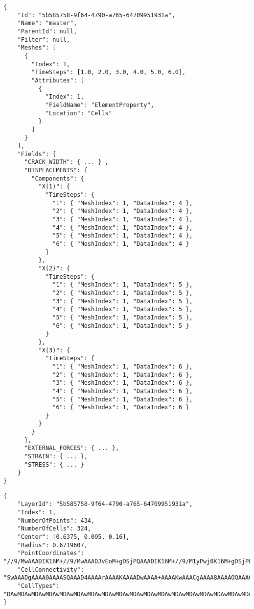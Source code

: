 \begin{lstlisting}[style=json,caption=Example of summary.json document,label=lst:summary.json]
{
    "Id": "5b585758-9f64-4790-a765-64709951931a",
    "Name": "master",
    "ParentId": null,
    "Filter": null,
    "Meshes": [
      {
        "Index": 1,
        "TimeSteps": [1.0, 2.0, 3.0, 4.0, 5.0, 6.0],
        "Attributes": [
          {
            "Index": 1,
            "FieldName": "ElementProperty",
            "Location": "Cells"
          }
        ]
      }
    ],
    "Fields": {
      "CRACK_WIDTH": { ... } ,
      "DISPLACEMENTS": {
        "Components": {
          "X(1)": {
            "TimeSteps": {
              "1": { "MeshIndex": 1, "DataIndex": 4 },
              "2": { "MeshIndex": 1, "DataIndex": 4 },
              "3": { "MeshIndex": 1, "DataIndex": 4 },
              "4": { "MeshIndex": 1, "DataIndex": 4 },
              "5": { "MeshIndex": 1, "DataIndex": 4 },
              "6": { "MeshIndex": 1, "DataIndex": 4 }
            }
          },
          "X(2)": {
            "TimeSteps": {
              "1": { "MeshIndex": 1, "DataIndex": 5 },
              "2": { "MeshIndex": 1, "DataIndex": 5 },
              "3": { "MeshIndex": 1, "DataIndex": 5 },
              "4": { "MeshIndex": 1, "DataIndex": 5 },
              "5": { "MeshIndex": 1, "DataIndex": 5 },
              "6": { "MeshIndex": 1, "DataIndex": 5 }
            }
          },
          "X(3)": {
            "TimeSteps": {
              "1": { "MeshIndex": 1, "DataIndex": 6 },
              "2": { "MeshIndex": 1, "DataIndex": 6 },
              "3": { "MeshIndex": 1, "DataIndex": 6 },
              "4": { "MeshIndex": 1, "DataIndex": 6 },
              "5": { "MeshIndex": 1, "DataIndex": 6 },
              "6": { "MeshIndex": 1, "DataIndex": 6 }
            }
          }
        }
      },
      "EXTERNAL_FORCES": { ... },
      "STRAIN": { ... },
      "STRESS": { ... }
    }
}
\end{lstlisting}

\begin{lstlisting}[style=json,caption=Example of mesh.json document,label=lst:mesh.json]
{
    "LayerId": "5b585758-9f64-4790-a765-64709951931a",
    "Index": 1,
    "NumberOfPoints": 434,
    "NumberOfCells": 324,
    "Center": [0.6375, 0.095, 0.16],
    "Radius": 0.6719607,
    "PointCoordinates": "//9/MwAAADIK16M+//9/MwAAADJvEoM+gDSjPQAAADIK16M+//9/M1yPwj0K16M+gDSjPQAAAD...",
    "CellConnectivity": "SwAAADgAAAA0AAAASQAAAD4AAAArAAAAKAAAADwAAAA+AAAAKwAAACgAAAA8AAAAOQAAACUAAA...",
    "CellTypes": "DAwMDAwMDAwMDAwMDAwMDAwMDAwMDAwMDAwMDAwMDAwMDAwMDAwMDAwMDAwMDAwMDAwMDAwMDAwMDAwMD..."
}
\end{lstlisting}

